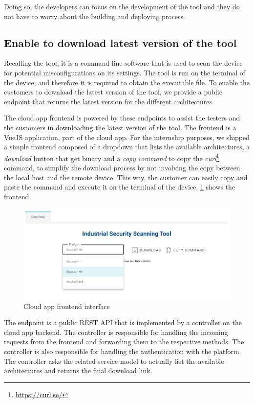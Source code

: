 Doing so, the developers can focus on the development of the tool and they do not have to worry about the building and deploying process.

\subsection{Enable to download latest version of the tool}

Recalling the tool, it is a command line software that is used to scan the device for potential misconfigurations on its settings. The tool is run on the terminal of the device, and therefore it is required to obtain the executable file. To enable the customers to download the latest version of the tool, we provide a public endpoint that returns the latest version for the different architectures.

The cloud app frontend is powered by these endpoints to assist the testers and the customers in downloading the latest version of the tool. The frontend is a VueJS application, part of the cloud app. For the internship purposes, we shipped a simple frontend composed of a dropdown that lists the available architectures, a \textit{download} button that get binary and a \textit{copy command} to copy the \textit{curl}\footnote{\url{https://curl.se/}} command, to simplify the download process by not involving the copy between the local host and the remote device. This way, the customer can easily copy and paste the command and execute it on the terminal of the device. \cref{fig:cloud-app-frontend} shows the frontend.

\begin{figure}[ht]
  \centering
  \includegraphics[width=1.0\textwidth]{chapters/05/assets/cloud-app-frontend}
  \caption{Cloud app frontend interface}
  \label{fig:cloud-app-frontend}
\end{figure}

The endpoint is a public REST API that is implemented by a controller on the cloud app backend. The controller is responsible for handling the incoming requests from the frontend and forwarding them to the respective methods. The controller is also responsible for handling the authentication with the platform. The controller asks the related service model to actually list the available architectures and returns the final download link.

